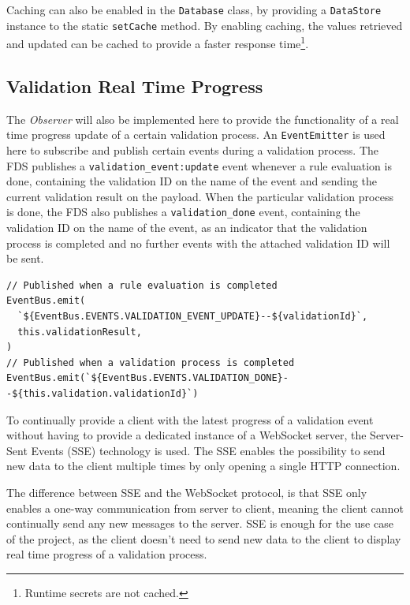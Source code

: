     Caching can also be enabled in the \verb;Database; class, by providing a \verb;DataStore; instance to the static \verb;setCache; method. By enabling caching, the values retrieved and updated can be cached to provide a faster response time\footnote{Runtime secrets are not cached.}. 

  \subsection{Validation Real Time Progress}
  
    The \emph{Observer} \autocite[pp. 293-303]{gamma-1995} will also be implemented here to provide the functionality of a real time progress update of a certain validation process. An \verb;EventEmitter; is used here to subscribe and publish certain events during a validation process. The FDS publishes a \verb;validation_event:update; event whenever a rule evaluation is done, containing the validation ID on the name of the event and sending the current validation result on the payload. When the particular validation process is done, the FDS also publishes a \verb;validation_done; event, containing the validation ID on the name of the event, as an indicator that the validation process is completed and no further events with the attached validation ID will be sent. 

    \begin{lstlisting}[style=es6, caption={Publishing events to the EventEmitter on certain validation events (TypeScript)}]
// Published when a rule evaluation is completed
EventBus.emit(
  `${EventBus.EVENTS.VALIDATION_EVENT_UPDATE}--${validationId}`,
  this.validationResult,
)
// Published when a validation process is completed
EventBus.emit(`${EventBus.EVENTS.VALIDATION_DONE}--${this.validation.validationId}`)
    \end{lstlisting}
    
    To continually provide a client with the latest progress of a validation event without having to provide a dedicated instance of a WebSocket server, the Server-Sent Events (SSE)\autocite{rfc8895} technology is used. The SSE enables the possibility to send new data to the client multiple times by only opening a single HTTP connection. 
    
    The difference between SSE and the WebSocket protocol, is that SSE only enables a one-way communication from server to client, meaning the client cannot continually send any new messages to the server. SSE is enough for the use case of the project, as the client doesn't need to send new data to the client to display real time progress of a validation process.

